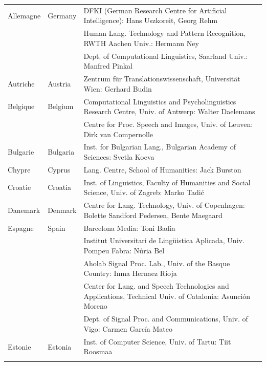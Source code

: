 \small
\begin{longtable}{llp{105mm}}
  Allemagne & \textcolor{grey1}{Germany} & DFKI (German Research Centre for Artificial Intelligence): Hans Uszkoreit, Georg Rehm\\ \addlinespace
  & & Human Lang. Technology and Pattern Recognition, RWTH Aachen Univ.: Hermann Ney \\ \addlinespace
  & & Dept. of Computational Linguistics, Saarland Univ.: Manfred Pinkal\\ \addlinespace 
  Autriche & \textcolor{grey1}{Austria} & Zentrum für Translationswissenschaft, Universität Wien: Gerhard Budin\\ \addlinespace 
  Belgique & \textcolor{grey1}{Belgium} & Computational Linguistics and Psycholinguistics Research Centre, Univ. of Antwerp: Walter Daelemans\\ \addlinespace
  & & Centre for Proc. Speech and Images, Univ. of Leuven: Dirk van Compernolle \\ \addlinespace
  Bulgarie & \textcolor{grey1}{Bulgaria} & Inst. for Bulgarian Lang., Bulgarian Academy of Sciences: Svetla Koeva \\ \addlinespace
  Chypre & \textcolor{grey1}{Cyprus} & Lang. Centre, School of Humanities: Jack Burston\\ \addlinespace
  Croatie & \textcolor{grey1}{Croatia} & Inst. of Linguistics, Faculty of Humanities and Social Science, Univ. of Zagreb: Marko Tadić \\ \addlinespace
  Danemark &  \textcolor{grey1}{Denmark} & Centre for Lang. Technology, Univ. of Copenhagen: Bolette Sandford Pedersen, Bente Maegaard\\ \addlinespace
  Espagne & \textcolor{grey1}{Spain} & Barcelona Media: Toni Badia \\ \addlinespace 
  & & Institut Universitari de Lingüistica Aplicada, Univ. Pompeu Fabra: Núria Bel \\ \addlinespace 
  & & Aholab Signal Proc. Lab., Univ. of the Basque Country: Inma Hernaez Rioja \\ \addlinespace 
  & & Center for Lang. and Speech Technologies and Applications, Technical Univ. of Catalonia: Asunción Moreno \\ \addlinespace 
  & & Dept. of Signal Proc. and Communications, Univ. of Vigo: Carmen García Mateo \\ \addlinespace 
  Estonie & \textcolor{grey1}{Estonia} & Inst. of Computer Science, Univ. of Tartu: Tiit Roosmaa\\ \addlinespace

\end{longtable}
